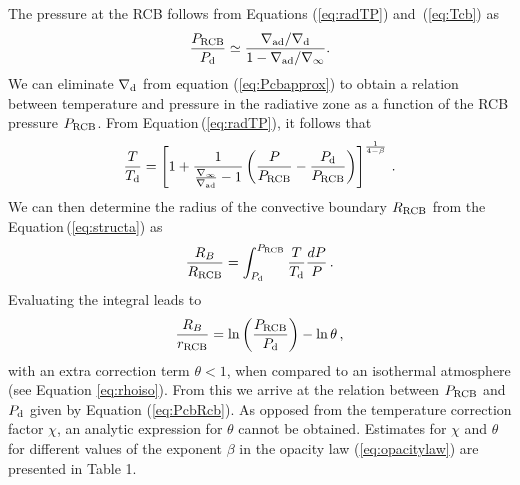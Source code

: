 \documentclass[apj, numberedappendix]{emulateapj}
\newcommand{\Eq}[1]{Equation\,(\ref{#1})}
\newcommand{\Eqs}[2]{Equations (\ref{#1}) and~(\ref{#2})}
\newcommand{\App}[1]{Appendix~\ref{#1}}
\newcommand{\delad}{\nabla_{\rm ad}}
\newcommand{\di}{_{\rm d}}
\newcommand{\cb}{_{\rm RCB}}
\begin{document}
The pressure at the RCB follows from \Eqs{eq:radTP}{eq:Tcb} as
\begin{equation}
\label{eq:Pcbapprox}
{P\cb\over P_{\rm d}} \simeq {\delad/\nabla\di \over 1 - \delad/\nabla_\infty}.
\end{equation} 
 We can eliminate $\nabla\di$ from equation (\ref{eq:Pcbapprox}) to obtain a relation between temperature and pressure in the radiative zone as a function of the RCB pressure $P\cb$. From \Eq{eq:radTP}, it follows that
 \begin{equation}\label{eq:TP}
{T \over T_{\rm d}} = \left[1 + {1 \over {\nabla_\infty \over \delad} - 1} \left({P \over P\cb} -  {P_{\rm d} \over P\cb}\right) \right]^{1 \over 4-\beta}\, .
\end{equation} 
 We can then determine the radius of the convective boundary $R\cb$ from the \Eq{eq:structa} as 
\begin{equation}\label{eq:RCBint}
{R_B \over R\cb} = \int_{P\di}^{P\cb} {T \over T_{\rm d}} {dP \over P}\, .
\end{equation}
Evaluating the integral leads to 
\begin{equation}\label{eq:Rcb}
{R_B \over r\cb} = \ln \left(P\cb \over P\di \right) - \ln \theta \, ,
\end{equation} 
with an extra correction term $\theta < 1$, when compared to an isothermal atmosphere (see Equation \ref{eq:rhoiso}). From this we arrive at the relation between $P\cb$ and $P\di$ given by Equation (\ref{eq:PcbRcb}). As opposed from the temperature correction factor $\chi$, an analytic expression for  $\theta$ cannot be obtained. Estimates for $\chi$ and $\theta$ for different values of the exponent $\beta$ in the opacity law (\ref{eq:opacitylaw}) are presented in Table 1.


\end{document}
